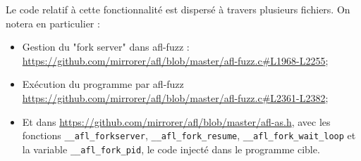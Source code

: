 Le code relatif à cette fonctionnalité est dispersé à travers plusieurs fichiers.
On notera en particulier :
\begin{itemize}
  \item{} Gestion du "fork server" dans afl-fuzz : \url{https://github.com/mirrorer/afl/blob/master/afl-fuzz.c#L1968-L2255};
  \item{} Exécution du programme par afl-fuzz \url{https://github.com/mirrorer/afl/blob/master/afl-fuzz.c#L2361-L2382};
  \item{} Et dans \url{https://github.com/mirrorer/afl/blob/master/afl-as.h}, avec les fonctions \lstinline{__afl_forkserver}, \lstinline{__afl_fork_resume}, \lstinline{__afl_fork_wait_loop} et la variable \lstinline{__afl_fork_pid}, le code injecté dans le programme cible.
\end{itemize}

